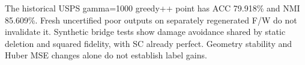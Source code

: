 The historical USPS gamma=1000 greedy++ point has ACC 79.918\% and NMI 85.609\%. Fresh uncertified poor outputs on separately regenerated F/W do not invalidate it. Synthetic bridge tests show damage avoidance shared by static deletion and squared fidelity, with SC already perfect. Geometry stability and Huber MSE changes alone do not establish label gains.
